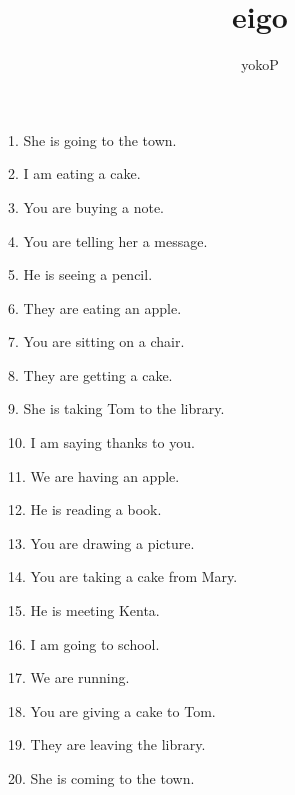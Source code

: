 \documentclass[uplatex,
paper=a4,
fontsize=18pt,
jafontsize=16pt,
number_of_lines=30,
line_length=30zh,
baselineskip=25pt,
]{jlreq}
\author{yokoP}
\title{eigo}
\begin{document}
1.  She is  going to the town.

2.  I am  eating a cake.

3.  You are  buying a note.

4.  You are  telling her a message.

5.  He is  seeing a pencil.

6.  They are  eating an apple.

7.  You are  sitting on a chair.

8.  They are  getting a cake.

9.  She is  taking Tom to the library.

10.  I am  saying thanks to you.

11.  We are  having an apple.

12.  He is  reading a book.

13.  You are  drawing a picture.

14.  You are  taking a cake from Mary.

15.  He is  meeting Kenta.

16.  I am  going to school.

17.  We are  running.

18.  You are  giving a cake to Tom.

19.  They are  leaving the library.

20.  She is  coming to the town.
\end{document}
